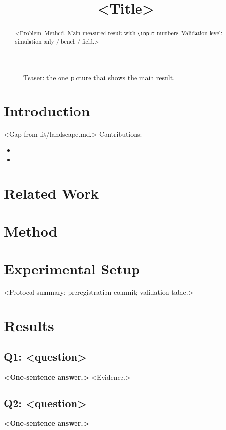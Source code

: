 \documentclass[conference]{IEEEtran}
\begin{document}
\title{<Title>}
\author{}
\maketitle
\begin{abstract}
<Problem. Method. Main measured result with \texttt{\textbackslash input} numbers. Validation level: simulation only / bench / field.>
\end{abstract}

\begin{figure}[t]\centering
\caption{Teaser: the one picture that shows the main result.}\label{fig:teaser}
\end{figure}

\section{Introduction}
<Gap from lit/landscape.md.> Contributions:
\begin{itemize}
\item <C1, tied to Q1> \item <C2, tied to Q2>
\end{itemize}

\section{Related Work}
\section{Method}
\section{Experimental Setup}
<Protocol summary; preregistration commit; validation table.>

\section{Results}
\subsection{Q1: <question>}
\textbf{<One-sentence answer.>} <Evidence.>
\subsection{Q2: <question>}
\textbf{<One-sentence answer.>}
\end{document}
